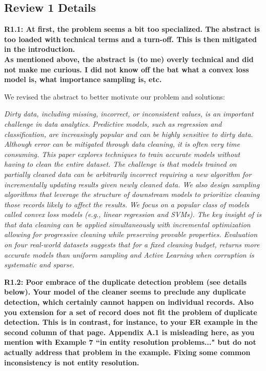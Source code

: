 \subsection*{Review 1 Details} 

\noindent\textbf{R1.1: At first, the problem seems a bit too specialized. The abstract is too loaded with technical terms and a turn-off. This is then mitigated in the introduction. \\
As mentioned above, the abstract is (to me) overly technical and did not make me curious. I did not know off the bat what a convex loss model is, what importance sampling is, etc.}

\noindent We revised the abstract to better motivate our problem and solutions:

\emph{Dirty data, including missing, incorrect, or inconsistent values, is an important challenge in data analytics.
Predictive models, such as regression and classification, are increasingly popular and can be highly sensitive to dirty data.
Although error can be mitigated through data cleaning, it is often very time consuming.
This paper explores techniques to train accurate models without having to clean the entire dataset.
The challenge is that models trained on partially cleaned data can be arbitrarily incorrect requiring a new algorithm for incrementally updating results given newly cleaned data.
We also design sampling algorithms that leverage the structure of downstream models to prioritize cleaning those records likely to affect the results.
We focus on a popular class of models called convex loss models (e.g., linear regression and SVMs).
The key insight of \sys is that data cleaning can be applied simultaneously with incremental optimization allowing for progressive cleaning while preserving provable properties.
Evaluation on four real-world datasets suggests that for a fixed cleaning budget, \sys returns more accurate models than uniform sampling and Active Learning when corruption is systematic and sparse.}

\vspace{0.5em}

\noindent\textbf{R1.2: Poor embrace of the duplicate detection problem (see details below). Your model of the cleaner seems to preclude any duplicate detection, which certainly cannot happen on individual records. Also you extension for a set of record does not fit the problem of duplicate detection. This is in contrast, for instance, to your ER example in the second column of that page. Appendix A.1 is misleading here, as you mention with Example 7 ``in entity resolution problems..." but do not actually address that problem in the example. Fixing some common inconsistency is not entity resolution.}

